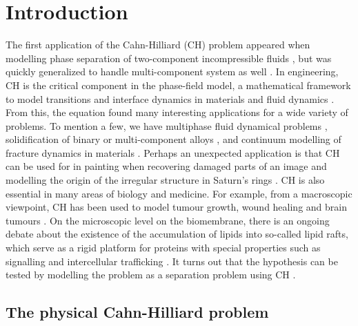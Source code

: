 \documentclass[11pt]{article}
\theoremstyle{remark}
\numberwithin{equation}{section}
\begin{document}
\newpage
\section{Introduction}\label{sec:introduction}


The first application of the Cahn-Hilliard (CH) problem appeared when modelling phase separation of two-component incompressible fluids \cite{cahn1958free, cahn1959free, cahn1961spinodal}, but was quickly generalized to handle multi-component system
as well \cite{bosch2015fractional, eyre1993systems, toth2016phase, miranville2017cahn}. In engineering, CH is the critical component in
the phase-field model, a mathematical framework to model transitions and interface dynamics in materials and fluid dynamics \cite{steinbach2009phase, chen2002phase}.
From this, the equation found many interesting applications for a wide variety of problems. To mention a few, we have
multiphase fluid dynamical problems \cite{badalassi2003computation, li2016lattice, kim2012phase, shen2010phase}, solidification of binary or multi-component alloys \cite{kim1999phase, echebarria2004quantitative}, and continuum modelling of fracture dynamics in
materials \cite{kuhn2010continuum, li2015phase}. Perhaps an unexpected application is that CH can be used for in painting when recovering damaged parts of an image \cite{bertozzi2006inpainting, burger2009cahn, bosch2015fractional, brkic2020image}
and modelling the origin of the irregular structure in Saturn's rings \cite{tremaine2003origin}.
CH is also essential in many areas of biology and medicine. For example, from a macroscopic viewpoint, CH has been used to model tumour growth, wound healing and brain tumours \cite{agosti2017cahn, cristini2009nonlinear}.
On the microscopic level on the biomembrane, there is an ongoing debate about the existence of the accumulation of lipids into so-called lipid rafts, which serve as a rigid platform for proteins with
special properties such as signalling and intercellular trafficking \cite{ levental2020lipid, hancock2006lipid, munro2003lipid, simons1997functional}. It turns out that the hypothesis can be tested by modelling the problem as a separation problem using
CH \cite{miller2020divide, garcke2016coupled, yushutin2019computational}.

\subsection{The physical Cahn-Hilliard problem}%
\label{sub:the_equations}
\end{document}
